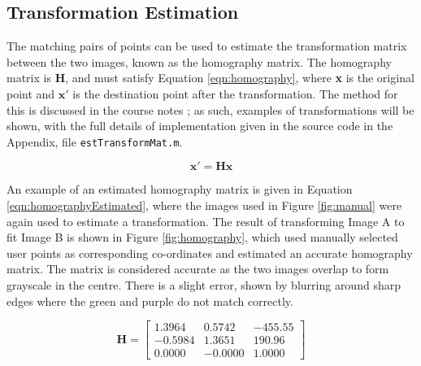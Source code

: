 \documentclass[a4paper, 10pt, conference]{ieeeconf}
\begin{document}

\subsection{Transformation Estimation}


The matching pairs of points can be used to estimate the transformation matrix between the two images, known as the homography matrix. The homography matrix is \textbf{H}, and must satisfy Equation \ref{eqn:homography}, where \textbf{x} is the original point and $\textbf{x}'$ is the destination point after the transformation. The method for this is discussed in the course notes \cite{notes}; as such, examples of transformations will be shown, with the full details of implementation given in the source code in the Appendix, file \texttt{estTransformMat.m}.

\begin{equation} \label{eqn:homography}
\textbf{x}' = \textbf{Hx}
\end{equation}

An example of an estimated homography matrix is given in Equation \ref{eqn:homographyEstimated}, where the images used in Figure \ref{fig:manual} were again used to estimate a transformation. The result of transforming Image A to fit Image B is shown in Figure \ref{fig:homography}, which used manually selected user points as corresponding co-ordinates and estimated an accurate homography matrix. The matrix is considered accurate as the two images overlap to form grayscale in the centre. There is a slight error, shown by blurring around sharp edges where the green and purple do not match correctly.

\begin{equation} \label{eqn:homographyEstimated}
\textbf{H} = \begin{bmatrix}
    1.3964 & 0.5742 & -455.55 \\
    -0.5984 & 1.3651 & 190.96 \\
    0.0000 & -0.0000 & 1.0000
\end{bmatrix}
\end{equation}
\end{document}
